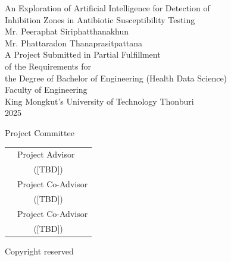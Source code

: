 \documentclass[12pt,a4paper,oneside]{report}
\begin{document}
\begin{titlepage}
  \thispagestyle{empty}
  \centering{}

  {\normalsize
    An Exploration of Artificial Intelligence for Detection of\\
    Inhibition Zones in Antibiotic Susceptibility Testing}\\[2cm]

  {\normalsize
    Mr. Peeraphat Siriphatthanakhun\\[0.2cm]
    Mr. Phattaradon Thanaprasitpattana}\\[2cm]

  {\normalsize
    A Project Submitted in Partial Fulfillment\\
    of the Requirements for\\
    the Degree of Bachelor of Engineering (Health Data Science)\\
    Faculty of Engineering\\
    King Mongkut's University of Technology Thonburi\\
    2025}\\[1.5cm]

  \begin{flushleft}
  Project Committee\\[1cm]
  \end{flushleft}

  \begin{tabular}{@{}p{10cm}@{\quad}l@{}}
    \dotfill & Project Advisor \\[0.3cm]
    \multicolumn{2}{c}{([TBD])} \\[1.2cm]
    \dotfill & Project Co-Advisor \\[0.3cm]
    \multicolumn{2}{c}{([TBD])} \\[1.2cm]
    \dotfill & Project Co-Advisor \\[0.3cm]
    \multicolumn{2}{c}{([TBD])} \\[1.2cm]
  \end{tabular}

  \vfill
  {\normalsize Copyright reserved}
\end{titlepage}

\pagestyle{fancy}
\setcounter{page}{2}
\end{document}

